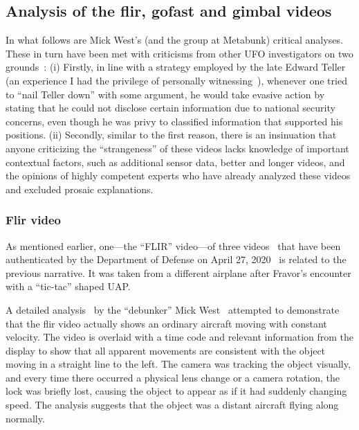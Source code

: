 \subsection{Analysis of the flir, gofast and gimbal videos}

In what follows are Mick West's (and the group at Metabunk) critical analyses.
These in turn have been met with criticisms from other UFO investigators on two grounds~\cite{WestElizondo2021Mar}:
(i) Firstly, in line with a strategy employed by the late Edward Teller
(an experience I had the privilege of personally witnessing~\cite{Etim1992Aug}),
whenever one tried to ``nail Teller down'' with some argument,
he would take evasive action by stating that he could not disclose certain information due to national security concerns,
even though he was privy to classified information that supported his positions.
(ii) Secondly, similar to the first reason, there is an insinuation that anyone criticizing the ``strangeness'' of these videos
lacks knowledge of important contextual factors,
such as additional sensor data, better and longer videos,
and the opinions of highly competent experts who have already analyzed these videos and excluded prosaic explanations.


\subsubsection{Flir video}

As mentioned earlier, one---the ``FLIR'' video---of
three videos~\cite{NAVAIRFOIAFLIR2020Apr,NAVAIRFOIAGOFAST2020Apr,NAVAIRFOIAGIMBAL2020Apr}
that have been authenticated by the Department of Defense on April 27, 2020~\cite{DOD2020} is related to the previous narrative.
It was taken from a different airplane after Fravor's encounter with a ``tic-tac'' shaped UAP.

A detailed analysis~\cite{West2022Nov,WestFlir2020May,WestFravorWest2020Sep} by the ``debunker'' Mick West~\cite{Metabunk2023Mar}  
attempted to demonstrate that the flir video actually shows an ordinary aircraft moving with constant velocity.
The video is overlaid with a time code and relevant information from the display to
show that all apparent movements are consistent with the object moving in a straight line to the left.
The camera was tracking the object visually, and every time there occurred a physical lens change or a camera rotation,
the lock was briefly lost, causing the object to appear as if it had suddenly changing speed.
The analysis suggests that the object was a distant aircraft flying along normally.

